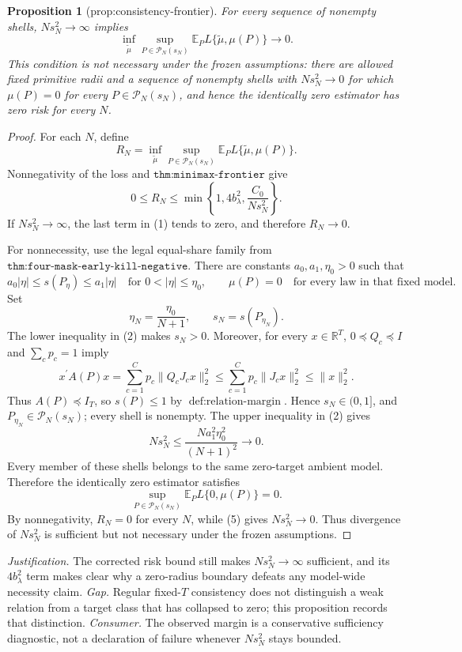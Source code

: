 \documentclass{article}
\newtheorem{proposition}{Proposition}
\begin{document}
\begin{proposition}[prop:consistency-frontier]\label{prop:consistency-frontier}
For every sequence of nonempty shells, \(Ns_N^2\to\infty\) implies
\[
\inf_{\widetilde\mu}\sup_{P\in\mathcal P_N(s_N)}
\mathbb E_P L\{\widetilde\mu,\mu(P)\}\longrightarrow0.
\]
This condition is not necessary under the frozen assumptions: there are allowed fixed primitive radii and a sequence of nonempty shells with \(Ns_N^2\to0\) for which \(\mu(P)=0\) for every \(P\in\mathcal P_N(s_N)\), and hence the identically zero estimator has zero risk for every \(N\).
\end{proposition}
\begin{proof}
For each \(N\), define
\[
R_N=\inf_{\widetilde\mu}\sup_{P\in\mathcal P_N(s_N)}
\mathbb E_PL\{\widetilde\mu,\mu(P)\}.
\]
Nonnegativity of the loss and \(\texttt{thm:minimax-frontier}\) give
\[
0\leq R_N\leq\min\!\left\{1,4b_\lambda^2,\frac{C_0}{Ns_N^2}\right\}.
\tag{1}
\]
If \(Ns_N^2\to\infty\), the last term in (1) tends to zero, and therefore \(R_N\to0\).

For nonnecessity, use the legal equal-share family from \(\texttt{thm:four-mask-early-kill-negative}\). There are constants \(a_0,a_1,\eta_0>0\) such that
\[
a_0|\eta|\leq s(P_\eta)\leq a_1|\eta|
\quad\text{for }0<|\eta|\leq\eta_0,
\qquad
\mu(P)=0\quad\text{for every law in that fixed model}.
\tag{2}
\]
Set
\[
\eta_N=\frac{\eta_0}{N+1},
\qquad
s_N=s(P_{\eta_N}).
\tag{3}
\]
The lower inequality in (2) makes \(s_N>0\). Moreover, for every \(x\in\mathbb R^T\), \(0\preceq Q_c\preceq I\) and \(\sum_cp_c=1\) imply
\[
x^{\prime}A(P)x
=\sum_{c=1}^Cp_c\|Q_cJ_cx\|_2^2
\leq\sum_{c=1}^Cp_c\|J_cx\|_2^2
\leq\|x\|_2^2.
\tag{4}
\]
Thus \(A(P)\preceq I_T\), so \(s(P)\leq1\) by \(\operatorname{def:relation\text{-}margin}\). Hence \(s_N\in(0,1]\), and \(P_{\eta_N}\in\mathcal P_N(s_N)\); every shell is nonempty. The upper inequality in (2) gives
\[
Ns_N^2\leq\frac{Na_1^2\eta_0^2}{(N+1)^2}\longrightarrow0.
\tag{5}
\]
Every member of these shells belongs to the same zero-target ambient model. Therefore the identically zero estimator satisfies
\[
\sup_{P\in\mathcal P_N(s_N)}
\mathbb E_PL\{0,\mu(P)\}=0.
\tag{6}
\]
By nonnegativity, \(R_N=0\) for every \(N\), while (5) gives \(Ns_N^2\to0\). Thus divergence of \(Ns_N^2\) is sufficient but not necessary under the frozen assumptions.
\end{proof}
\par\smallskip\noindent \textit{Justification.} The corrected risk bound still makes \(Ns_N^2\to\infty\) sufficient, and its \(4b_\lambda^2\) term makes clear why a zero-radius boundary defeats any model-wide necessity claim. \textit{Gap.} Regular fixed-\(T\) consistency does not distinguish a weak relation from a target class that has collapsed to zero; this proposition records that distinction. \textit{Consumer.} The observed margin is a conservative sufficiency diagnostic, not a declaration of failure whenever \(Ns_N^2\) stays bounded.
\end{document}
